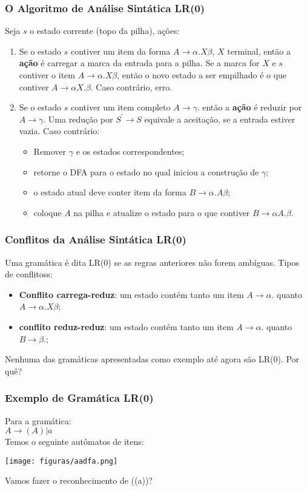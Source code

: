\documentclass[table]{beamer}
\begin{document}
\begin{frame}
   \frametitle{O Algoritmo de Análise Sintática LR(0)}
   Seja $s$ o estado corrente (topo da pilha), ações:
   \begin{enumerate}
      \item Se o estado $s$ contiver um item da forma $A\to\alpha.X\beta$, $X$ terminal, então a \textbf{ação} é carregar a marca da entrada para a pilha. Se a marca for $X$ e $s$ contiver o item $A\to\alpha.X\beta$, então o novo estado a ser empilhado é o que contiver $A\to\alpha X.\beta$. Caso contrário, erro.
      \item Se o estado $s$ contiver um item completo $A\to\gamma.$ então a \textbf{ação} é reduzir por $A\to\gamma$. Uma redução por $S^{'}\to S$ equivale a aceitação, se a entrada estiver vazia. Caso contrário:
      \begin{itemize}
         \item Remover $\gamma$ e os estados correspondentes;
	 \item retorne o DFA para o estado no qual iniciou a construção de $\gamma$;
	 \item o estado atual deve conter item da forma $B\to\alpha.A\beta$;
	 \item coloque $A$ na pilha e atualize o estado para o que contiver $B\to\alpha A.\beta$.
      \end{itemize}
   \end{enumerate}
\end{frame}

\begin{frame}
   \frametitle{Conflitos da Análise Sintática LR(0)}
   Uma gramática é dita LR(0) se as regras anteriores não forem ambíguas. Tipos de conflitoss:
   \begin{itemize}
      \item \textbf{Conflito carrega-reduz}: um estado contém tanto um item $A\to\alpha.$ quanto $A\to\alpha.X\beta$;
      \item \textbf{conflito reduz-reduz}:  um estado contém tanto um item $A\to\alpha.$ quanto $B\to\beta.$;
  \end{itemize}
  Nenhuma das gramáticas apresentadas como exemplo até agora são LR(0). Por quê?
\end{frame}

\begin{frame}
   \frametitle{Exemplo de Gramática LR(0)}
   Para a gramática: \\
   $A\to(A)|a$ \\
   Temos o seguinte autômatos de itens: \\
   \begin{center}
   \texttt{[image: figuras/aadfa.png]}
   \end{center}
   Vamos fazer o reconhecimento de ((a))?
\end{frame}
\end{document}
